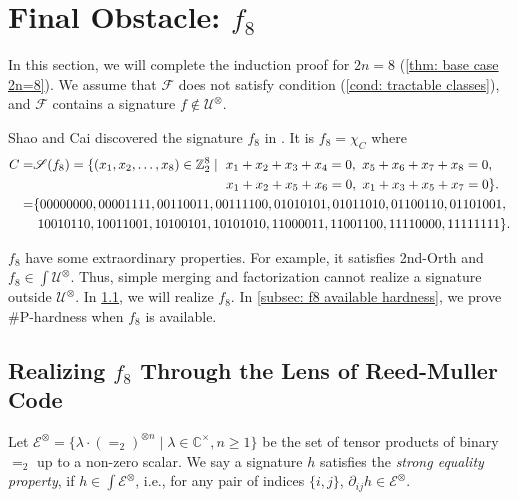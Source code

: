 \section{Final Obstacle: \texorpdfstring{$f_8$}{f8}}
\label{sec: 2n=8}
\label{sec: f8}

In this section, we will complete the induction proof for $2n=8$  (\cref{thm: base case 2n=8}).
We assume that $\mathcal F$ does not satisfy condition \rm{(\ref{cond: tractable classes})}, and $\mathcal{F}$ contains a signature $f\notin \mathcal{U}^\otimes.$

Shao and Cai discovered the signature $f_8$ in \cite{realholant}.
It is $f_8=\chi_C$ where
\begin{equation}\label{eq: f8}
 \begin{aligned}
  C=&\mathscr{S}(f_8)=\{(x_1, x_2, \ldots, x_8)\in \mathbb{Z}_2^{8} \mid~
x_1+x_2+x_3+x_4= 0, ~ x_5+x_6+x_7+x_8= 0,\\
  &\hspace{34ex}x_1+x_2+x_5+x_6= 0, ~ x_1+x_3+x_5+x_7= 0\}.\\
=&\{00000000, 00001111, 00110011, 00111100, 01010101, 01011010, 01100110, 01101001,\\
& ~10010110,  10011001, 10100101, 10101010, 11000011, 11001100, 11110000, 11111111\}.
\end{aligned}
\end{equation}

$f_8$ have some extraordinary properties.
For example, it satisfies {\sc 2nd-Orth} and $f_8\in \int \mathcal{U}^{\otimes}$.
Thus, simple merging and factorization cannot realize a signature outside $\mathcal{U}^{\otimes}$.
In \cref{subsec: realize f8 Reed Muller}, we will realize $f_8$.
In \cref{subsec: f8 available hardness}, we prove \#P-hardness when $f_8$ is available.

\subsection{Realizing \texorpdfstring{$f_8$}{f8} Through the Lens of Reed-Muller Code}
\label{subsec: realize f8 Reed Muller}

\begin{definition}\label{def: Strong equality property}
    Let $\mathcal{E}^\otimes=\{\lambda\cdot (=_2)^{\otimes n}\mid \lambda\in \mathbb{C}^\times,n\ge1\}$ be the set of tensor products of binary $=_2$ up to a non-zero scalar.
    We say a signature $h$ satisfies the \emph{strong equality property}, if $h\in \int \mathcal{E}^{\otimes}$, i.e., for any pair of indices $\{i,j\}$, $\partial_{ij}h\in \mathcal{E}^\otimes.$
\end{definition}

